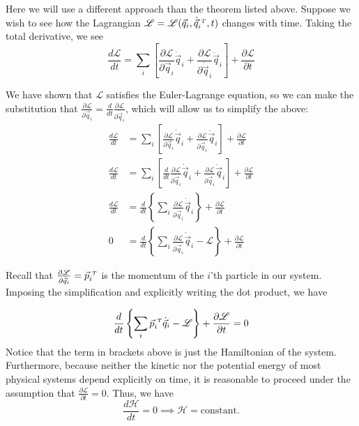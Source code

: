 \documentclass[12pt]{article}
\newcommand{\Lagr}	{\mathscr{L}}		%
\newcommand{\Haml}	{\mathscr{H}}		%
\newcommand{\q}		{\vec{q}}
\newcommand{\p}		{\vec{p}}
\newcommand{\T}		{{\hspace{0.1cm} \scriptscriptstyle{T}}}
\begin{document}
Here we will use a different approach than the theorem listed above. Suppose we wish to see how the Lagrangian $\Lagr = \Lagr (\q_i, \dot{\q}^\T_i, t)$ changes with time. Taking the total derivative, we see
\begin{equation*}
\frac{d \Lagr}{dt}	
	= \sum_i \left[ \frac{\partial \Lagr}{\partial \q_i} \dot{\q}_i 
		+ \frac{\partial \Lagr}{\partial \dot{\q}_i} \ddot{\q}_i \right]
		+ \frac{\partial \Lagr}{\partial t}
\end{equation*}

We have shown that $\Lagr$ satisfies the Euler-Lagrange equation, so we can make the substitution that $\frac{\partial \Lagr}{\partial \q_i} = \frac{d}{dt} \frac{\partial \Lagr}{\partial \dot{\q}_i}$, which will allow us to simplify the above:
\begin{align*}
\frac{d \Lagr}{dt}	
	&= \sum_i \left[ \frac{\partial \Lagr}{\partial \q_i} \dot{\q}_i 
		+ \frac{\partial \Lagr}{\partial \dot{\q}_i} \ddot{\q}_i \right]
		+ \frac{\partial \Lagr}{\partial t}								\\
\frac{d \Lagr}{dt}	
	&= \sum_i \left[ 
		\frac{d}{dt} \frac{\partial \Lagr}{\partial \dot{\q}_i} \dot{\q}_i 
		+ \frac{\partial \Lagr}{\partial \dot{\q}_i} \ddot{\q}_i \right]
		+ \frac{\partial \Lagr}{\partial t}								\\
\frac{d \Lagr}{dt}
	&= \frac{d}{dt} \left\{ \sum_i \frac{\partial \Lagr}
		{\partial \dot{\q}_i} \dot{\q}_i \right\}
		+ \frac{\partial \Lagr}{\partial t}								\\
0	&= \frac{d}{dt} \left\{ \sum_i \frac{\partial \Lagr}
		{\partial \dot{\q}_i} \dot{\q}_i - \Lagr \right\} 
		+ \frac{\partial \Lagr}{\partial t}
\end{align*}

Recall that $\frac{\partial \Lagr}{\partial \dot{\q}_i} = \p_i^\T$ is the momentum of the $i$'th particle in our system. Imposing the simplification and explicitly writing the dot product, we have

\begin{equation*}
\frac{d}{dt} \left\{ \sum_i \p_i^\T \dot{\q}_i - \Lagr \right\} 
		+ \frac{\partial \Lagr}{\partial t} = 0
\end{equation*}
Notice that the term in brackets above is just the Hamiltonian of the system. Furthermore, because neither the kinetic nor the potential energy of most physical systems depend explicitly on time, it is reasonable to proceed under the assumption that $\frac{\partial \Lagr}{\partial t} = 0$. Thus, we have
\begin{equation*}
\frac{d\Haml}{dt} = 0 \implies \Haml = \text{constant.}
\end{equation*}
\end{document}
